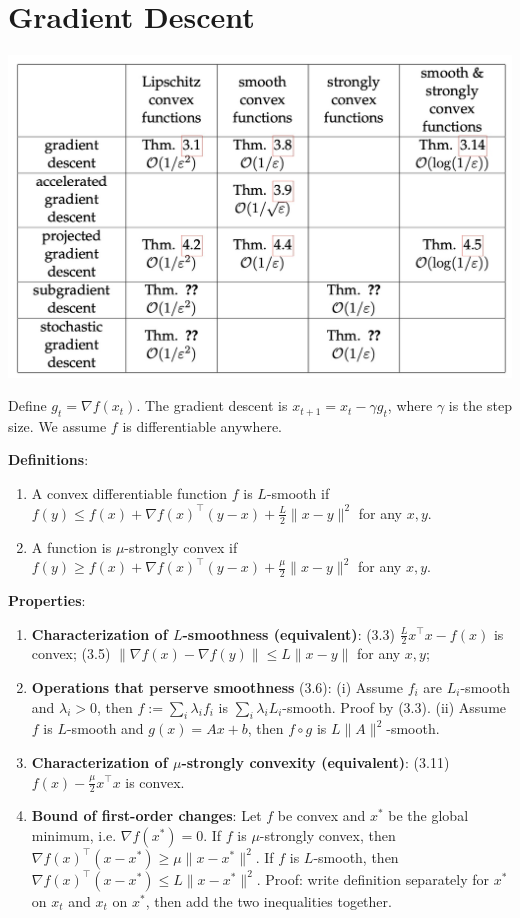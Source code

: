 \section{Gradient Descent}

\includegraphics[width=\linewidth]{imgs/GD.jpg}

Define $g_t = \nabla f(x_t)$. The gradient descent is $x_{t+1} = x_t - \gamma g_t$, where $\gamma$ is the step size. We assume $f$ is differentiable anywhere.

\textbf{Definitions}:
\begin{enumerate}
    \item A convex differentiable function $f$ is $L$-smooth if $f(y) \le f(x) + \nabla f(x)^\top (y-x) + \frac{L}{2}\|x-y\|^2$ for any $x, y$.
    \item A function is $\mu$-strongly convex if $f(y) \ge f(x) + \nabla f(x)^\top (y-x) + \frac{\mu}{2}\|x-y\|^2$ for any $x, y$.
\end{enumerate}

\textbf{Properties}:
\begin{enumerate}
    \item \textbf{Characterization of $L$-smoothness (equivalent)}: (3.3) $\frac{L}{2}x^\top x - f(x)$ is convex; (3.5) $\|\nabla f(x) - \nabla f(y)\| \le L \|x-y\|$ for any $x,y$;
    \item \textbf{Operations that perserve smoothness} (3.6): (i) Assume $f_i$ are $L_i$-smooth and $\lambda_i >0$, then $f:= \sum_{i} \lambda_i f_i$ is $\sum_i \lambda_i L_i$-smooth. Proof by (3.3). (ii) Assume $f$ is $L$-smooth and $g(x) = Ax+b$, then $f\circ g$ is $L\|A\|^2$-smooth.
    \item \textbf{Characterization of $\mu$-strongly convexity (equivalent)}: (3.11) $f(x) - \frac{\mu}{2}x^\top x$ is convex.
    \item \textbf{Bound of first-order changes}: Let $f$ be convex and $x^*$ be the global minimum, i.e. $\nabla f(x^*) = 0$. If $f$ is $\mu$-strongly convex, then $\nabla f(x)^\top (x - x^*) \ge \mu \|x-x^*\|^2$. If $f$ is $L$-smooth, then $\nabla f(x)^\top (x - x^*) \le L \|x-x^*\|^2$. Proof: write definition separately for $x^*$ on $x_t$ and $x_t$ on $x^*$, then add the two inequalities together.
\end{enumerate}

